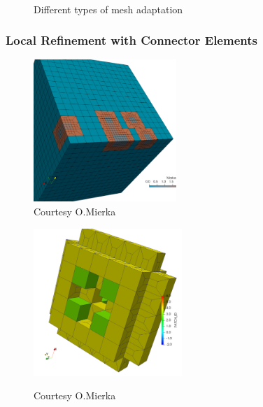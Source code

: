\begin{frame}
\begin{figure}[h!]
\centering
{}\\
\caption{Different types of mesh adaptation}
\end{figure}
\end{frame}

\begin{frame}
\frametitle{Local Refinement with Connector Elements}
\begin{figure}[h!]
\centering
\includegraphics[width=0.48\textwidth]{screenshots/PROTOTYPE2.png}
\caption{Courtesy O.Mierka}
\label{fig:domains}
\end{figure}
\end{frame}

\begin{frame}
\begin{figure}[h!]
\centering
\includegraphics[width=0.5\textwidth]{screenshots/P4.png}
\label{fig:domains}
\caption{Courtesy O.Mierka}
\end{figure}
\end{frame}

